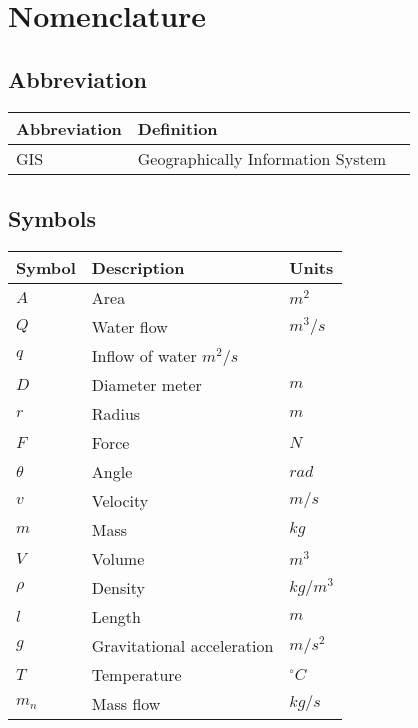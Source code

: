 \chapter*{Nomenclature}\label{ch:nomenclature}
\section*{Abbreviation}
\begin{longtable}[H]{p{80pt} p{300pt} p{40pt}}
\textbf{Abbreviation}	& \textbf{Definition} & \textbf{ } \\ \hline
GIS	  & Geographically Information System		&\\

\end{longtable}

\section*{Symbols}
\begin{longtable}[H]{p{80pt} p{280pt} p{50pt}} 
\textbf{Symbol}	& \textbf{Description} & \textbf{Units}  \\ \hline
$A$ & Area & $m^2$ \\ 
$Q$ & Water flow & $m^3/s$ \\
$q$ & Inflow of water $m^2/s$ \\
$D$ & Diameter meter & $m$ \\ 
$r$ & Radius & $m$ \\ 
$F$ & Force & $N$ \\ 
$\theta$ & Angle & $rad$ \\ 
$v$ & Velocity & $m/s$ \\ 
$m$ & Mass & $kg$ \\
$V$ & Volume & $m^3$ \\
$\rho$ & Density & $kg/m^3$ \\
$l$ & Length & $m$ \\
$g$ & Gravitational acceleration & $m/s^2$ \\
$T$ & Temperature & $^{\circ}C$ \\
$m_n$ & Mass flow & $kg/s$ \\

\end{longtable}


